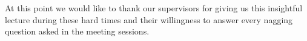 \documentclass[11pt, letterpaper, twocolumn]{article}
\begin{document}
At this point we would like to thank our supervisors for giving us this insightful lecture during these hard times and their willingness to answer every nagging question asked in the meeting sessions. 




{\footnotesize
}



\end{document}
